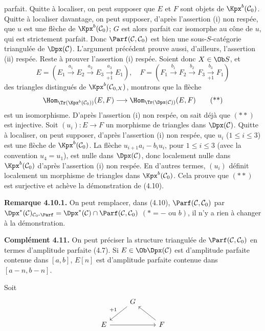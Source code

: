 parfait. Quitte à localiser, on peut supposer que \(E\) et \(F\) sont objets de \(\Kpx^b(\mathcal C_0)\). Quitte à localiser davantage, on peut supposer, d'après l'assertion (i) non respée, que \(u\) est une flèche de \(\Kpx^b(\mathcal C_0)\); \(G\) est alors parfait car isomorphe au cône de \(u\), qui est strictement parfait. Donc \(\Parf(\mathcal C,\mathcal C_0)\) est bien une sous-\(S\)-catégorie triangulée de \(\Dpx(\mathcal C)\). L'argument précédent prouve aussi, d'ailleurs, l'assertion (ii) respée. Reste à prouver l'assertion (i) respée. Soient donc \(X\in\Ob S\), et
\[
E=(E_1\xrightarrow{a_1}E_2\xrightarrow{a_2}E_3\xrightarrow[+1]{a_3}E_1),
\quad
F=(F_1\xrightarrow{b_1}F_2\xrightarrow{b_2}F_3\xrightarrow[+1]{b_3}F_1)
\]
des triangles distingués de \(\Kpx^b(\mathcal C_{0,X})\), montrons que la flèche
\[
  \Hom_{\Tr(\Kpx^b(\mathcal C_0))}(E,F)
  \longrightarrow
  \Hom_{\Tr(\Dpx(\mathcal C))}(E,F)
  \tag{**}
\]
est un isomorphisme. D'après l'assertion (i) non respée, on sait déjà que \((**)\) est injective. Soit \((u_i):E\to F\) un morphisme de triangles dans \(\Dpx(\mathcal C)\). Quitte à localiser, on peut supposer, d'après l'assertion (i) non respée, que \(u_i\) (\(1\leq i\leq3\)) est une flèche de \(\Kpx^b(\mathcal C_0)\). La flèche \(u_{i+1}a_i-b_iu_i\), pour \(1\leq i\leq3\) (avec la convention \(u_4=u_1\)), est nulle dans \(\Dpx(\mathcal C)\), donc localement nulle dans \(\Kpx^b(\mathcal C_0)\) d'après l'assertion (i) non respée. En d'autres termes, \((u_i)\) définit localement un morphisme de triangles dans \(\Kpx^b(\mathcal C_0)\). Cela prouve que \((**)\) est surjective et achève la démonstration de (4.10).

\textbf{Remarque 4.10.1.} On peut remplacer, dans (4.10), \(\Parf(\mathcal C,\mathcal C_0)\) par \(\Dpx^*(\mathcal C)_{\mathcal C_0\text{-}\Parf}=\Dpx^*(\mathcal C)\cap\Parf(\mathcal C,\mathcal C_0)\) \((*=-\text{ ou }b)\), il n'y a rien à changer à la démonstration.

\textbf{Complément 4.11.} On peut préciser la structure triangulée de \(\Parf(\mathcal C,\mathcal C_0)\) en termes d'amplitude parfaite (4.7). Si \(E\in\Ob\Dpx(\mathcal C)\) est d'amplitude parfaite contenue dans \([a,b]\), \(E[n]\) est d'amplitude parfaite contenue dans \([a-n,b-n]\).

Soit
\[
\begin{tikzcd}
& G \arrow[dl,"+1"'] & \\
E \arrow[rr] && F \arrow[ul]
\end{tikzcd}
\]
